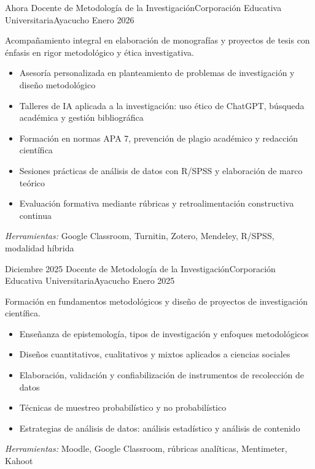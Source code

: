 
\begin{experiences}

\experience
{Ahora} {Docente de Metodología de la Investigación}{Corporación Educativa Universitaria}{Ayacucho}
{Enero 2026} {
	Acompañamiento integral en elaboración de monografías y proyectos de tesis con énfasis en rigor metodológico y ética investigativa.
	\begin{itemize}
		\item Asesoría personalizada en planteamiento de problemas de investigación y diseño metodológico
		\item Talleres de IA aplicada a la investigación: uso ético de ChatGPT, búsqueda académica y gestión bibliográfica
		\item Formación en normas APA 7, prevención de plagio académico y redacción científica
		\item Sesiones prácticas de análisis de datos con R/SPSS y elaboración de marco teórico
		\item Evaluación formativa mediante rúbricas y retroalimentación constructiva continua
	\end{itemize}
}
{\footnotesize{\emph{Herramientas:} Google Classroom, Turnitin, Zotero, Mendeley, R/SPSS, modalidad híbrida}}
\emptySeparator

\experience
{Diciembre 2025} {Docente de Metodología de la Investigación}{Corporación Educativa Universitaria}{Ayacucho}
{Enero 2025} {
	Formación en fundamentos metodológicos y diseño de proyectos de investigación científica.
	\begin{itemize}
		\item Enseñanza de epistemología, tipos de investigación y enfoques metodológicos
		\item Diseños cuantitativos, cualitativos y mixtos aplicados a ciencias sociales
		\item Elaboración, validación y confiabilización de instrumentos de recolección de datos
		\item Técnicas de muestreo probabilístico y no probabilístico
		\item Estrategias de análisis de datos: análisis estadístico y análisis de contenido
	\end{itemize}
}
{\footnotesize{\emph{Herramientas:} Moodle, Google Classroom, rúbricas analíticas, Mentimeter, Kahoot}}
\emptySeparator


\end{experiences}

